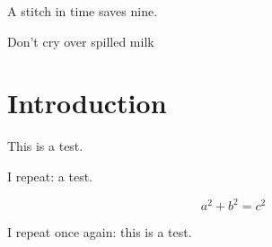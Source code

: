 
A stitch in time
saves nine.

Don't cry over spilled milk




\section{Introduction}

This is a test.

I repeat: a test.

\[
  a^2 + b^2 = c^2
\]

I repeat once again: this is a test.



